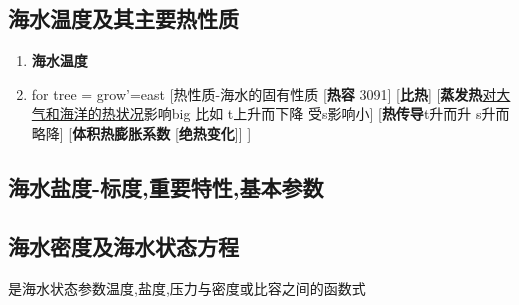 	\subsection{海水温度及其主要热性质}
		\begin{enumerate}[1)]
			\item \textbf{海水温度}
			\item  
				\begin{forest}
					for tree = {grow'=east}
					[热性质-海水的固有性质
						[\textbf{热容} 3091]
						[\textbf{比热}]
						[\textbf{蒸发热}\underline{对大气和海洋的热状况}影响big 比如 t上升而下降 受s影响小]
						[\textbf{热传导}t升而升 s升而略降]
						[\textbf{体积热膨胀系数}
						[\textbf{绝热变化}]]
						]
				\end{forest}
		\end{enumerate}
	
	\subsection{海水盐度-标度,重要特性,基本参数}
	
	\subsection{海水密度及海水状态方程}
		是海水状态参数温度,盐度,压力与密度或比容之间的函数式
		
